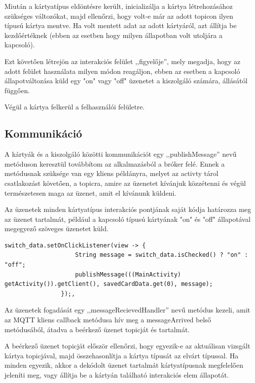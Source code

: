 \documentclass[
]{thesis-ekf}
\theoremstyle{definition}
\theoremstyle{remark}
\begin{document}
Miután a kártyatípus eldöntésre került, inicializálja a kártya létrehozásához szükséges változókat, majd ellenőrzi, hogy volt-e már az adott topicon ilyen típusú kártya mentve.
Ha volt mentett adat az adott kártyáról, azt állítja be kezdőértéknek
(ebben az esetben hogy milyen állapotban volt utoljára a kapcsoló).

Ezt követően létrejön az interakciós felület ,,figyelője'', mely megadja, hogy az adott felület használata
milyen módon reagáljon, ebben az esetben a kapcsoló állapotváltozása küld egy "on" vagy "off" üzenetet a
kiszolgáló számára, állásától függően.

Végül a kártya felkerül a felhasználói felületre.

\subsection{Kommunikáció}
A kártyák és a kiszolgáló közötti kommunikációt egy ,,publishMessage'' nevű metóduson keresztül továbbítom
az alkalmazásból a bróker felé. Ennek a metódusnak szüksége van egy kliens példányra, melyet az activty tárol
csatlakozást követően, a topicra, amire az üzenetet kívánjuk közzétenni és végül természetesen maga az üzenet, amit
el kívánunk küldeni.

Az üzenetek minden kártyatípus interakciós pontjának saját kódja határozza meg az üzenet tartalmát, például
a kapcsoló típusú kártyának "on" és "off" állapotával megegyező szöveges üzenetet küld. 

\lstset{language=Java}
\begin{lstlisting}[frame=single]
switch_data.setOnClickListener(view -> {
                    String message = switch_data.isChecked() ? "on" : "off";
                    publishMessage(((MainActivity) getActivity()).getClient(), savedCardData.get(0), message);
                });,
\end{lstlisting}

Az üzenetek fogadását egy ,,messageRecievedHandler'' nevű metódus kezeli, amit az MQTT kliens callback metódusa
hív meg a messageArrived belső metódusából, átadva a beérkező üzenet topicját és tartalmát.

A beérkező üzenet topicját először ellenőrzi, hogy egyezik-e az aktuálisan vizsgált kártya topicjával, majd
összehasonlítja a kártya típusát az elvárt típussal. Ha minden egyezik, akkor a dekódolt üzenet tartalmát
kártyatípusnak megfelelően jeleníti meg, vagy állítja be a kártyán található interakciós elem állapotát.
\end{document}
